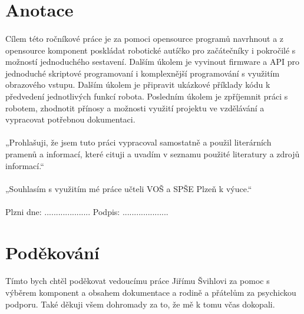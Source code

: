 \documentclass[12pt]{article}
\begin{document}
	\thispagestyle{empty}
	
	
	\begin{spacing}{1.5}
	
	\newpage
	\thispagestyle{empty}
	\section*{Anotace}
	\paragraph{} Cílem této ročníkové práce je za pomoci opensource programů navrhnout a z opensource komponent poskládat robotické autíčko pro začátečníky i pokročilé s možností jednoduchého sestavení. Dalším úkolem je vyvinout firmware a API pro jednoduché skriptové programovaní i komplexnější programování s využitím obrazového vstupu. Dalším úkolem je připravit ukázkové příklady kódu k předvedení jednotlivých funkcí robota. Posledním úkolem je zpříjemnit práci s robotem, zhodnotit přínosy a možnosti využití projektu ve vzdělávání a vypracovat potřebnou dokumentaci.
	\vfill
	\paragraph{} „Prohlašuji, že jsem tuto práci vypracoval samostatně a použil literárních pramenů a informací, které cituji a uvadím v seznamu použité literatury a zdrojů informací.“
	\paragraph{} „Souhlasím s využitím mé práce učteli VOŠ a SPŠE Plzeň k výuce.“
	\paragraph{} \hfill Plzni dne: .................... Podpis: ....................
	
	\newpage
	\thispagestyle{empty}
	\section*{Poděkování}
	\paragraph{} Tímto bych chtěl poděkovat vedoucímu práce Jiřímu Švihlovi za pomoc s výběrem komponent a obsahem dokumentace a rodině a přátelům za psychickou podporu. Také děkuji všem dohromady za to, že mě k tomu včas dokopali.
	

\end{spacing}
\end{document}
